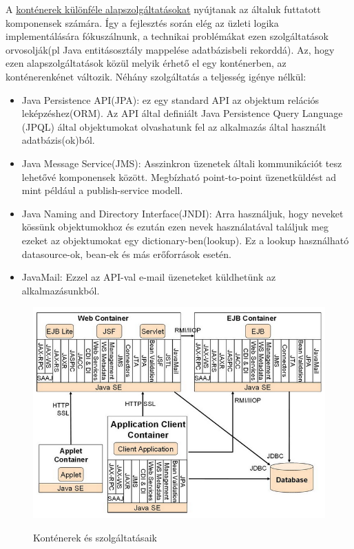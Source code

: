 \documentclass[centeredchapter]{thesis-ekf}
\theoremstyle{definition}
\theoremstyle{remark}
\begin{document}
A \hyperlink{figure-container-services}{konténerek különféle alapszolgáltatásokat} nyújtanak az általuk futtatott komponensek számára.
Így a fejlesztés során elég az üzleti logika implementálására fókuszálnunk, a technikai problémákat ezen szolgáltatások orvosolják(pl Java entitásosztály mappelése adatbázisbeli rekorddá).
Az, hogy ezen alapszolgáltatások közül melyik érhető el egy konténerben, az konténerenkénet változik.
Néhány szolgáltatás a teljesség igénye nélkül:\cite{BJEE}
\begin{itemize}
	\item Java Persistence API(JPA): ez egy standard API az objektum relációs leképzéshez(ORM). Az API által definiált Java Persistence Query Language (JPQL) által objektumokat olvashatunk fel az alkalmazás által használt adatbázis(ok)ból.
	\item Java Message Service(JMS): Asszinkron üzenetek általi kommunikációt tesz lehetővé komponensek között. Megbízható point-to-point üzenetküldést ad mint például a publish-service modell.
	\item Java Naming and Directory Interface(JNDI): Arra használjuk, hogy neveket kössünk objektumokhoz és ezután ezen nevek használatával találjuk meg ezeket az objektumokat egy dictionary-ben(lookup). Ez a lookup használható datasource-ok, bean-ek és más erőforrások esetén.
	\item JavaMail: Ezzel az API-val e-mail üzeneteket küldhetünk az alkalmazásunkból.
	
\end{itemize}

\hypertarget{figure-container-services}{}
\begin{figure}[!h]
	\centering
	\includegraphics[width=14cm]{kontener-szolgaltatasok.png}
	\caption{Konténerek és szolgáltatásaik}\cite{BJEE}
\end{figure}
\end{document}
